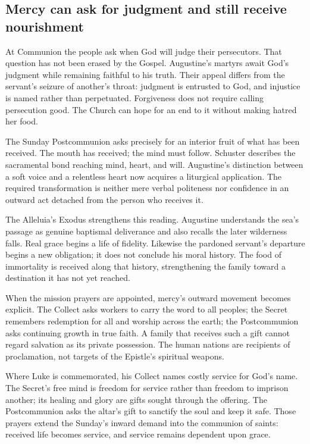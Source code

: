 \subsection{Mercy can ask for judgment and still receive nourishment}
At Communion the people ask when God will judge their persecutors.
That question has not been erased by the Gospel. Augustine's martyrs
await God's judgment while remaining faithful to his truth. Their
appeal differs from the servant's seizure of another's throat:
judgment is entrusted to God, and injustice is named rather than
perpetuated. Forgiveness does not require calling persecution good.
The Church can hope for an end to it without making hatred her food.

The Sunday Postcommunion asks precisely for an interior fruit of
what has been received. The mouth has received; the mind must follow.
Schuster describes the sacramental bond reaching mind, heart, and
will. Augustine's distinction between a soft voice and a relentless
heart now acquires a liturgical application. The required transformation
is neither mere verbal politeness nor confidence in an outward act
detached from the person who receives it.

The Alleluia's Exodus strengthens this reading. Augustine understands
the sea's passage as genuine baptismal deliverance and also recalls
the later wilderness falls. Real grace begins a life of fidelity.
Likewise the pardoned servant's departure begins a new obligation;
it does not conclude his moral history. The food of immortality is
received along that history, strengthening the family toward a
destination it has not yet reached.

When the mission prayers are appointed, mercy's outward movement
becomes explicit. The Collect asks workers to carry the word to all
peoples; the Secret remembers redemption for all and worship across
the earth; the Postcommunion asks continuing growth in true faith.
A family that receives such a gift cannot regard salvation as its
private possession. The human nations are recipients of proclamation,
not targets of the Epistle's spiritual weapons.

Where Luke is commemorated, his Collect names costly service for
God's name. The Secret's free mind is freedom for service rather
than freedom to imprison another; its healing and glory are gifts
sought through the offering. The Postcommunion asks the altar's
gift to sanctify the soul and keep it safe. Those prayers extend
the Sunday's inward demand into the communion of saints: received
life becomes service, and service remains dependent upon grace.

